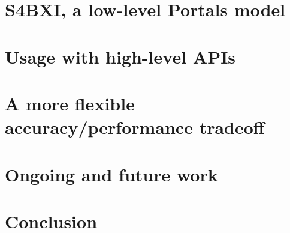 \documentclass[11pt,a4paper,twoside]{book}
\begin{document}


\chapter{S4BXI, a low-level Portals model}
\label{chap:low_level}



\chapter{Usage with high-level APIs}
\label{chap:high_level}



\chapter{A more flexible accuracy/performance tradeoff}
\label{chap:model_change}



\chapter{Ongoing and future work}
\label{chap:flowctrl}



\chapter{Conclusion}
\label{chap:conclusion}






\appendix

\end{document}
